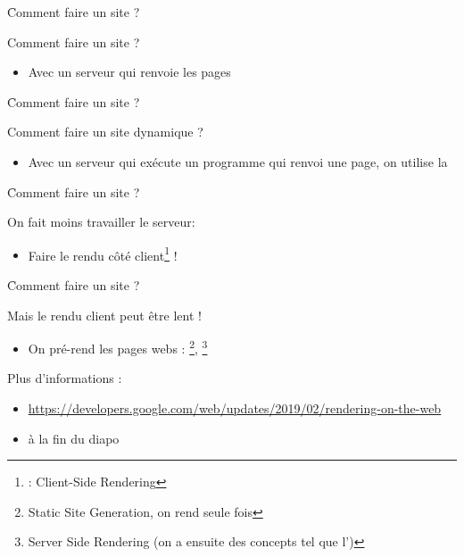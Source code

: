 \documentclass[12pt,aspectratio=169]{beamer}
\begin{document}
\f{Comment faire un site ?}{
Comment faire un site ?
\begin{itemize}
    \item Avec un serveur qui renvoie les pages
\end{itemize}
}

\f{Comment faire un site ?}{
Comment faire un site dynamique ?
\begin{itemize}
    \item Avec un serveur qui exécute un programme qui renvoi une page, on utilise la 
\end{itemize}
}





\f{Comment faire un site ?}{
On fait moins travailler le serveur:
\begin{itemize}
    \item Faire le rendu côté client\footnote{ : Client-Side Rendering} !
\end{itemize}
}

\f{Comment faire un site ?}{
Mais le rendu client peut être lent !
\begin{itemize}
    \item On pré-rend les pages webs : \footnote{Static Site Generation, on rend seule fois},  \footnote{Server Side Rendering (on a ensuite des concepts tel que l')}
\end{itemize}
{
\scriptsize
Plus d'informations :
\begin{itemize}
    \item \url{https://developers.google.com/web/updates/2019/02/rendering-on-the-web}
    \item à la fin du diapo
\end{itemize}
}
}
\end{document}
